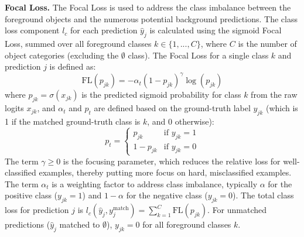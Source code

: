 \textbf{Focal Loss.} The Focal Loss is used to address the class imbalance between the foreground objects and the numerous potential background predictions. The class loss component $l_c$ for each prediction $\hat{y}_j$ is calculated using the sigmoid Focal Loss, summed over all foreground classes $k \in \{1, ..., C\}$, where $C$ is the number of object categories (excluding the $\emptyset$ class). The Focal Loss for a single class $k$ and prediction $j$ is defined as:
\begin{equation} \label{eq:focal_loss}
    \text{FL}(p_{jk}) = - \alpha_t (1 - p_{jk})^\gamma \log(p_{jk})
\end{equation}
where $p_{jk} = \sigma(x_{jk})$ is the predicted sigmoid probability for class $k$ from the raw logits $x_{jk}$, and $\alpha_t$ and $p_t$ are defined based on the ground-truth label $y_{jk}$ (which is 1 if the matched ground-truth class is $k$, and 0 otherwise):
\begin{equation*}
    p_t =
    \begin{cases}
        p_{jk} & \text{if } y_{jk} = 1 \\
        1 - p_{jk} & \text{if } y_{jk} = 0
    \end{cases}
\end{equation*}
The term $\gamma \ge 0$ is the focusing parameter, which reduces the relative loss for well-classified examples, thereby putting more focus on hard, misclassified examples. The term $\alpha_t$ is a weighting factor to address class imbalance, typically $\alpha$ for the positive class ($y_{jk}=1$) and $1-\alpha$ for the negative class ($y_{jk}=0$). The total class loss for prediction $j$ is $l_c(\hat{y}_j, y_j^{\text{match}}) = \sum_{k=1}^{C} \text{FL}(p_{jk})$. For unmatched predictions ($\hat{y}_j$ matched to $\emptyset$), $y_{jk}=0$ for all foreground classes $k$.

